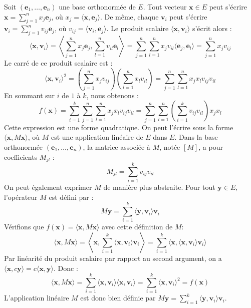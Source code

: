 \documentclass[11pt,a4paper]{report}
\begin{document}
Soit \((\mathbf{e}_1, \dots, \mathbf{e}_n)\) une base orthonormée de
\(E\). Tout vecteur \(\mathbf{x} \in E\) peut s'écrire
\(\mathbf{x} = \sum_{j=1}^n x_j \mathbf{e}_j\), où
\(x_j = \langle \mathbf{x}, \mathbf{e}_j \rangle\). De même, chaque
\(\mathbf{v}_i\) peut s'écrire
\(\mathbf{v}_i = \sum_{j=1}^n v_{ij} \mathbf{e}_j\), où
\(v_{ij} = \langle \mathbf{v}_i, \mathbf{e}_j \rangle\). Le produit
scalaire \(\langle \mathbf{x}, \mathbf{v}_i \rangle\) s'écrit alors :
\[ \langle \mathbf{x}, \mathbf{v}_i \rangle = \left\langle \sum_{j=1}^n x_j \mathbf{e}_j, \sum_{l=1}^n v_{il} \mathbf{e}_l \right\rangle = \sum_{j=1}^n \sum_{l=1}^n x_j v_{il} \langle \mathbf{e}_j, \mathbf{e}_l \rangle = \sum_{j=1}^n x_j v_{ij} \]
Le carré de ce produit scalaire est :
\[ \langle \mathbf{x}, \mathbf{v}_i \rangle^2 = \left( \sum_{j=1}^n x_j v_{ij} \right) \left( \sum_{l=1}^n x_l v_{il} \right) = \sum_{j=1}^n \sum_{l=1}^n x_j x_l v_{ij} v_{il} \]
En sommant sur \(i\) de \(1\) à \(k\), nous obtenons :
\[ f(\mathbf{x}) = \sum_{i=1}^k \sum_{j=1}^n \sum_{l=1}^n x_j x_l v_{ij} v_{il} = \sum_{j=1}^n \sum_{l=1}^n \left( \sum_{i=1}^k v_{ij} v_{il} \right) x_j x_l \]
Cette expression est une forme quadratique. On peut l'écrire sous la
forme \(\langle \mathbf{x}, M\mathbf{x} \rangle\), où \(M\) est une
application linéaire de \(E\) dans \(E\). Dans la base orthonormée
\((\mathbf{e}_1, \dots, \mathbf{e}_n)\), la matrice associée à \(M\),
notée \([M]\), a pour coefficients \(M_{jl}\) :
\[ M_{jl} = \sum_{i=1}^k v_{ij} v_{il} \] On peut également exprimer
\(M\) de manière plus abstraite. Pour tout \(\mathbf{y} \in E\),
l'opérateur \(M\) est défini par :
\[ M\mathbf{y} = \sum_{i=1}^k \langle \mathbf{y}, \mathbf{v}_i \rangle \mathbf{v}_i \]
Vérifions que
\(f(\mathbf{x}) = \langle \mathbf{x}, M\mathbf{x} \rangle\) avec cette
définition de \(M\):
\[ \langle \mathbf{x}, M\mathbf{x} \rangle = \left\langle \mathbf{x}, \sum_{i=1}^k \langle \mathbf{x}, \mathbf{v}_i \rangle \mathbf{v}_i \right\rangle = \sum_{i=1}^k \langle \mathbf{x}, \langle \mathbf{x}, \mathbf{v}_i \rangle \mathbf{v}_i \rangle \]
Par linéarité du produit scalaire par rapport au second argument, on a
\(\langle \mathbf{x}, c\mathbf{y} \rangle = c \langle \mathbf{x}, \mathbf{y} \rangle\).
Donc :
\[ \langle \mathbf{x}, M\mathbf{x} \rangle = \sum_{i=1}^k \langle \mathbf{x}, \mathbf{v}_i \rangle \langle \mathbf{x}, \mathbf{v}_i \rangle = \sum_{i=1}^k \langle \mathbf{x}, \mathbf{v}_i \rangle^2 = f(\mathbf{x}) \]
L'application linéaire \(M\) est donc bien définie par
\(M\mathbf{y} = \sum_{i=1}^k \langle \mathbf{y}, \mathbf{v}_i \rangle \mathbf{v}_i\).
\end{document}
